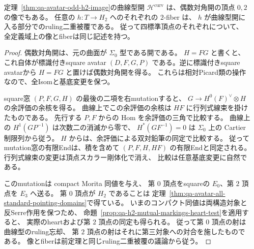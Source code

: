 \begin{theorem}
\label{thm:qa-avatar-even-h2-image}
定理~\ref{thm:qa-avatar-odd-h2-image}の曲線型開
$\mathcal H^{\mathrm{curv}}$ は、偶数対角開の頂点 $0,2$ の像でもある。
任意の $h:T\to H_2$ へのそれぞれの $2$-fiber は、
$h$ が曲線型開に入る部分でのruling二重被覆である。
従って四標準頂点のそれぞれについて、
全定義域上の像とfiberは同じ記述を持つ。
\end{theorem}
\begin{proof}
偶数対角開は、元の曲面が $\Sigma_0$ 型である開である。
$H=FG$ と書くと、これ自体が標識付きsquare avatar
$(D,F,G,P)$ である。逆に標識付きsquare avatarから
$H=FG$ と置けば偶数対角開を得る。
これらは相対Picard類の操作なので、全Isomと基底変更を保つ。

square窓 $(P,F,G,H)$ の最後の二項を右mutationすると、
$G\to H^0(F)^\vee\otimes H$ の余評価の余核を得る。
曲線上でこの余評価の余核は $HF$ に行列式線束を掛けたものである。
先行する $P,F$ からの Hom を余評価の三角で比較する。
曲線上の $H^1(GP^{-1})$ は次数二の消滅から零で、
$H^*(G F^{-1})=0$ は
$\Sigma_0$ 上の Cartier 制限列から従う。
$H$ からは、余評価による双対鉛筆の同定で比較する。
従ってmutation窓の有限Endは、積を含めて
$(P,F,H,HF)$ の有限Endと同定される。
行列式線束の変更は頂点スカラー剛体化で消え、
比較は任意基底変更に自然である。

このmutationは compact Morita 同値を与え、
第 $0$ 頂点をsquareの $E_0$、第 $2$ 頂点を $E_3$ へ送る。
第 $0$ 頂点が $H_2$ であることは
定理~\ref{thm:qa-avatar-all-standard-pointing-domains}で得ている。
いまのコンパクト同値は両構造対象と反Serre作用を保つため、
命題~\ref{prop:qa-h2-mutual-markings-heart-test}を適用すると、
実際のheartおよび第 $2$ 頂点の同定も得られる。
従って第 $0$ 頂点の射は曲線型のruling忘却、
第 $2$ 頂点の射はそれに第三対象への対合を施したものである。
像とfiberは前定理と同じruling二重被覆の議論から従う。
\end{proof}

